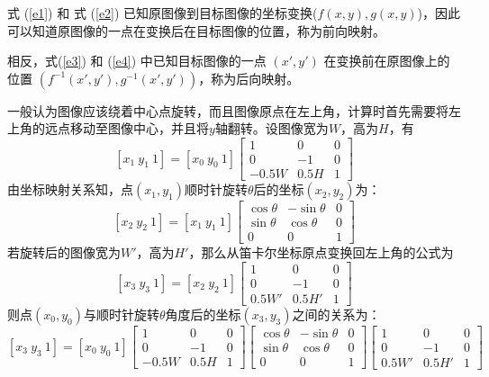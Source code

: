 \documentclass[UTF-8, a4paper, 12pt]{ctexart}
\begin{document}
式 (\ref{e1}) 和 式 (\ref{e2}) 已知原图像到目标图像的坐标变换($f(x,y),g(x,y)$)，因此可以知道原图像的一点在变换后在目标图像的位置，称为前向映射。

相反，式(\ref{e3}) 和 (\ref{e4}) 中已知目标图像的一点 $(x',y')$ 在变换前在原图像上的位置 $(f^{-1}(x′,y′),g^{-1}(x′,y′))$，称为后向映射。

一般认为图像应该绕着中心点旋转，而且图像原点在左上角，计算时首先需要将左上角的远点移动至图像中心，并且将$y$轴翻转。设图像宽为$W$，高为$H$，有
\begin{equation}
    \left[x_1\ y_1\ 1\right]=\left[x_0\ y_0\  1\right]\left[\begin{array}{ccc}
        1&0&0\\
        0&-1&0\\
        -0.5W&0.5H&1
    \end{array}\right]
\end{equation}
由坐标映射关系知，点$(x_1,y_1)$顺时针旋转$\theta$后的坐标$(x_2,y_2)$为：
\begin{equation}
    \left[x_2\ y_2\ 1\right]=\left[x_1\ y_1\ 1\right]\left[\begin{array}{ccc}
        \cos\theta &-\sin\theta&0\\
        \sin\theta&\cos\theta&0\\
        0&0&1
    \end{array}\right]
\end{equation}
若旋转后的图像宽为$W'$，高为$H'$，那么从笛卡尔坐标原点变换回左上角的公式为
\begin{equation}
    \left[x_3\ y_3\ 1\right]=\left[x_2\ y_2\ 1\right]\left[\begin{array}{ccc}
        1&0&0\\
        0&-1&0\\
        0.5W'&0.5H'&1
    \end{array}\right]
\end{equation}
则点$(x_0,y_0)$与顺时针旋转$\theta$角度后的坐标$(x_3,y_3)$之间的关系为：
\begin{equation}\label{forward}
    \left[x_3\ y_3\ 1\right]=\left[x_0\ y_0\  1\right]
    \left[\begin{array}{ccc}
        1&0&0\\
        0&-1&0\\
        -0.5W&0.5H&1
    \end{array}\right]\left[\begin{array}{ccc}
        \cos\theta &-\sin\theta&0\\
        \sin\theta&\cos\theta&0\\
        0&0&1
    \end{array}\right]\left[\begin{array}{ccc}
        1&0&0\\
        0&-1&0\\
        0.5W'&0.5H'&1
    \end{array}\right]
\end{equation}
\end{document}
